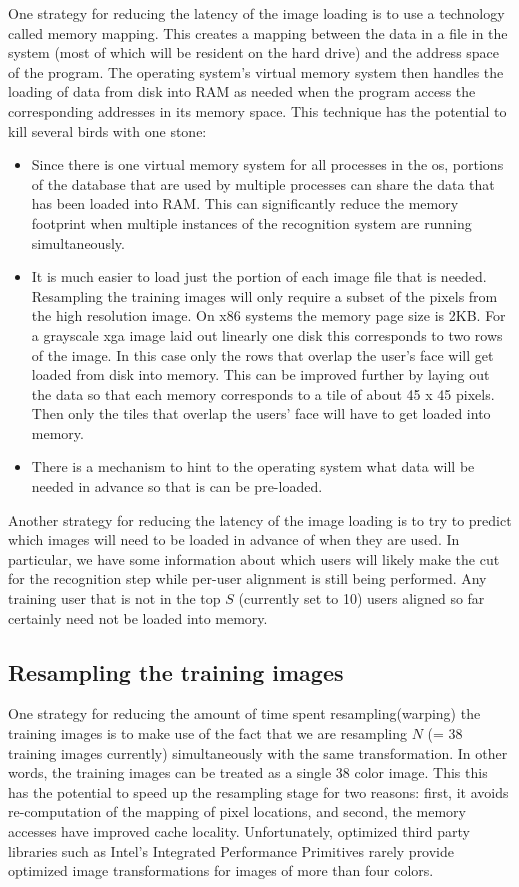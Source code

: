 One strategy for reducing the latency of the image loading is to use a
technology called memory mapping.  This creates a mapping between the data in a
file in the system (most of which will be resident on the hard drive) and the
address space of the program.  The operating system's virtual memory system
then handles the loading of data from disk into RAM as needed when the program
access the corresponding addresses in its memory space.  This technique has the
potential to kill several birds with one stone:
\begin{itemize}
\item Since there is one virtual memory system for all processes in the os,
portions of the database that are used by multiple processes can share the data
that has been loaded into RAM.  This can significantly reduce the memory
footprint when multiple instances of the recognition system are running
simultaneously.
\item It is much easier to load just the portion of each image file that is
needed.  Resampling the training images will only require a subset of the
pixels from the high resolution image.  On x86 systems the memory page size is
2KB.  For a grayscale xga image laid out linearly one disk this corresponds to
two rows of the image.  In this case only the rows that overlap the user's face
will get loaded from disk into memory.  This can be improved further by laying
out the data so that each memory corresponds to a tile of about 45 x 45 pixels.
Then only the tiles that overlap the users' face will have to get loaded into
memory.
\item There is a mechanism to hint to the operating system what data will be
needed in advance so that is can be pre-loaded.  
\end{itemize} 
Another strategy for reducing the latency of the image loading is to try to
predict which images will need to be loaded in advance of when they are used.
In particular, we have some information about which users will likely make the
cut for the recognition step while per-user alignment is still being performed.
Any training user that is not in the top $S$ (currently set to 10) users
aligned so far certainly need not be loaded into memory.  

\subsection{Resampling the training images}  
One strategy for reducing the amount of time spent resampling(warping) the
training images is to make use of the fact that we are resampling $N$ (= 38
training images currently) simultaneously with the same transformation. 
In other words, the training images can be treated as a single 38 color image.
This this has the potential to speed up the resampling stage for two reasons:
first, it avoids re-computation of the mapping of pixel locations, and second,
the memory accesses have improved cache locality.
Unfortunately, optimized third party libraries such as Intel's Integrated Performance
Primitives rarely provide optimized image
transformations for images of more than four colors.

